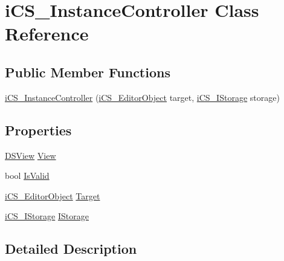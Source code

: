\hypertarget{classi_c_s___instance_controller}{\section{i\+C\+S\+\_\+\+Instance\+Controller Class Reference}
\label{classi_c_s___instance_controller}
}
\subsection*{Public Member Functions}
\begin{DoxyCompactItemize}
\item 
\hyperlink{classi_c_s___instance_controller_a48309f1ca2c74da731bee99f94a58ba3}{i\+C\+S\+\_\+\+Instance\+Controller} (\hyperlink{classi_c_s___editor_object}{i\+C\+S\+\_\+\+Editor\+Object} target, \hyperlink{classi_c_s___i_storage}{i\+C\+S\+\_\+\+I\+Storage} storage)
\end{DoxyCompactItemize}
\subsection*{Properties}
\begin{DoxyCompactItemize}
\item 
\hyperlink{class_d_s_view}{D\+S\+View} \hyperlink{classi_c_s___instance_controller_a182468db5fa543b932f842f89338a1ab}{View}
\item 
bool \hyperlink{classi_c_s___instance_controller_a9915e7b83716cdc93bba642845be21bd}{Is\+Valid}
\item 
\hyperlink{classi_c_s___editor_object}{i\+C\+S\+\_\+\+Editor\+Object} \hyperlink{classi_c_s___instance_controller_ac083a60a56887ab688cf415b1398e9f4}{Target}
\item 
\hyperlink{classi_c_s___i_storage}{i\+C\+S\+\_\+\+I\+Storage} \hyperlink{classi_c_s___instance_controller_af622da77c9c97dd2335600064b5f1629}{I\+Storage}
\end{DoxyCompactItemize}


\subsection{Detailed Description}


